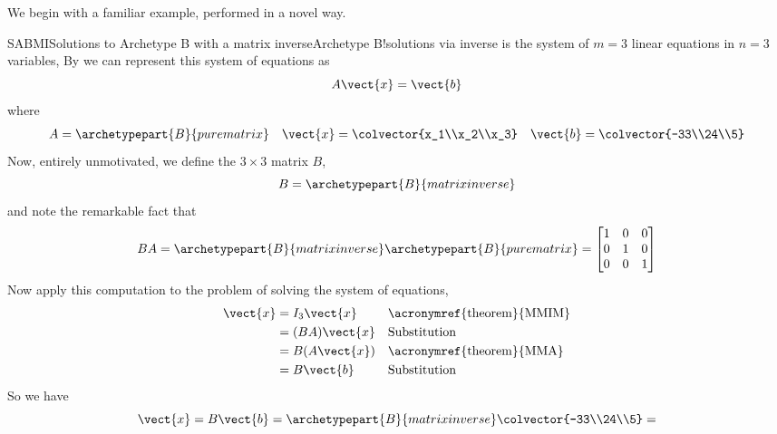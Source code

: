 %
We begin with a familiar example, performed in a novel way.
%
\begin{example}{SABMI}{Solutions to Archetype B with a matrix inverse}{Archetype B!solutions via inverse}
%
 is the system of $m=3$ linear equations in $n=3$ variables,
%
%
By  we can represent this system of equations as
%
\begin{equation*}
A\vect{x}=\vect{b}
\end{equation*}
%
where
%
\begin{align*}
A=\archetypepart{B}{purematrix}&&\vect{x}=\colvector{x_1\\x_2\\x_3}&&\vect{b}=\colvector{-33\\24\\5}
\end{align*}
%
Now, entirely unmotivated, we define the $3\times 3$ matrix $B$,
%
\begin{equation*}
B=\archetypepart{B}{matrixinverse}
\end{equation*}
%
and note the remarkable fact that
%
\begin{equation*}
BA=\archetypepart{B}{matrixinverse}\archetypepart{B}{purematrix}=
\begin{bmatrix}
1 & 0 & 0\\
0 & 1 & 0\\
0 & 0 & 1
\end{bmatrix}
\end{equation*}
%
Now apply this computation to the problem of solving the system of equations,
%
\begin{align*}
\vect{x}
&=I_3\vect{x}&&\text{\acronymref{theorem}{MMIM}}\\
&=(BA)\vect{x}&&\text{Substitution}\\
&=B(A\vect{x})&&\text{\acronymref{theorem}{MMA}}\\
&=B\vect{b}&&\text{Substitution}\\
\end{align*}
%
So we have
%
\begin{equation*}
\vect{x}=B\vect{b}=
\archetypepart{B}{matrixinverse}\colvector{-33\\24\\5}=

\end{equation*}
\end{example}
